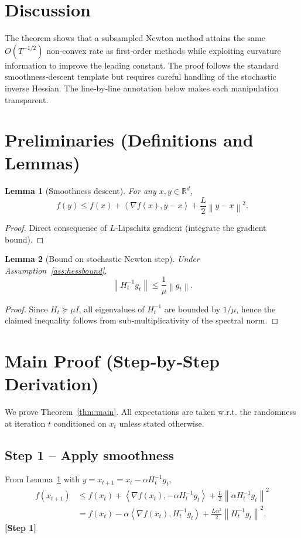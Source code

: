 \documentclass{article}
\newtheorem{lemma}{Lemma}
\newcommand{\norm}[1]{\left\|#1\right\|}
\newcommand{\inner}[2]{\left\langle #1,#2\right\rangle}
\newcommand{\grad}{\nabla}
\begin{document}
\section*{Discussion}
The theorem shows that a subsampled Newton method attains the same $O(T^{-1/2})$ non‑convex rate as first‑order methods while exploiting curvature information to improve the leading constant. The proof follows the standard smoothness‑descent template but requires careful handling of the stochastic inverse Hessian. The line‑by‑line annotation below makes each manipulation transparent.

\newpage
\section*{Preliminaries (Definitions and Lemmas)}
\begin{lemma}[Smoothness descent]\label{lem:smooth}
For any $x,y\in\mathbb{R}^{d}$,
\[
f(y)\le f(x)+\inner{\grad f(x)}{y-x}+\frac{L}{2}\norm{y-x}^{2}.
\]
\end{lemma}
\begin{proof}
Direct consequence of $L$‑Lipschitz gradient (integrate the gradient bound). \qedhere
\end{proof}

\begin{lemma}[Bound on stochastic Newton step]\label{lem:stepbound}
Under Assumption~\ref{ass:hessbound},
\[
\norm{H_{t}^{-1}g_{t}}\le\frac{1}{\mu}\norm{g_{t}}.
\]
\end{lemma}
\begin{proof}
Since $H_{t}\succeq \mu I$, all eigenvalues of $H_{t}^{-1}$ are bounded by $1/\mu$, hence the claimed inequality follows from sub‑multiplicativity of the spectral norm. \qedhere
\end{proof}

\newpage
\section*{Main Proof (Step‑by‑Step Derivation)}
We prove Theorem~\ref{thm:main}. All expectations are taken w.r.t. the randomness at iteration $t$ conditioned on $x_{t}$ unless stated otherwise.

\subsection*{Step 1 – Apply smoothness}
From Lemma~\ref{lem:smooth} with $y=x_{t+1}=x_{t}-\alpha H_{t}^{-1}g_{t}$,
\begin{align}
f(x_{t+1})
&\le f(x_{t})+\inner{\grad f(x_{t})}{-\alpha H_{t}^{-1}g_{t}}
     +\frac{L}{2}\norm{\alpha H_{t}^{-1}g_{t}}^{2}\nonumber\\
&= f(x_{t})-\alpha\inner{\grad f(x_{t})}{H_{t}^{-1}g_{t}}
   +\frac{L\alpha^{2}}{2}\norm{H_{t}^{-1}g_{t}}^{2}. \tag{1}
\end{align}
\noindent\textbf{[Step 1]}
\end{document}
